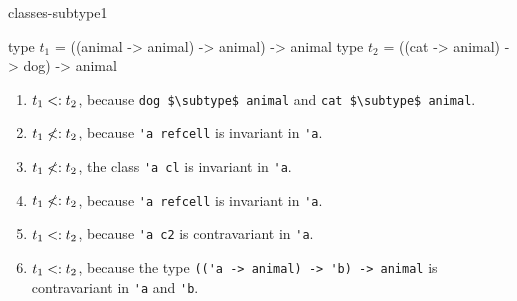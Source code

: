 \begin{exercise}{classes-subtype1}
\begin{enumerate}
\begin{ocamllisting}
type $t_1$ = ((animal -> animal) -> animal) -> animal
type $t_2$ = ((cat -> animal) -> dog) -> animal
\end{ocamllisting}

\end{enumerate}

\begin{answer}\ifanswers
\begin{enumerate}
\item $t_1 \mathrel{\hbox{<:}} t_2$, because \hbox{\lstinline/dog $\subtype$ animal/} and \hbox{\lstinline/cat $\subtype$ animal/}.
\item $t_1 \not\mathrel{\hbox{<:}} t_2$, because \hbox{\lstinline$'a refcell$} is invariant in \hbox{\lstinline$'a$}.
\item $t_1 \not\mathrel{\hbox{<:}} t_2$, the class \hbox{\lstinline$'a cl$} is invariant in \hbox{\lstinline$'a$}.
\item $t_1 \not\mathrel{\hbox{<:}} t_2$, because \hbox{\lstinline$'a refcell$} is invariant in \hbox{\lstinline$'a$}.
\item $t_1 \mathrel{\hbox{<:}} t_2$, because \hbox{\lstinline$'a c2$} is contravariant in \hbox{\lstinline$'a$}.
\item $t_1 \mathrel{\hbox{<:}} t_2$, because the type \hbox{\lstinline$(('a -> animal) -> 'b) -> animal$}
is contravariant in \hbox{\lstinline$'a$} and \hbox{\lstinline$'b$}.
\end{enumerate}
\fi\end{answer}
\end{exercise}

